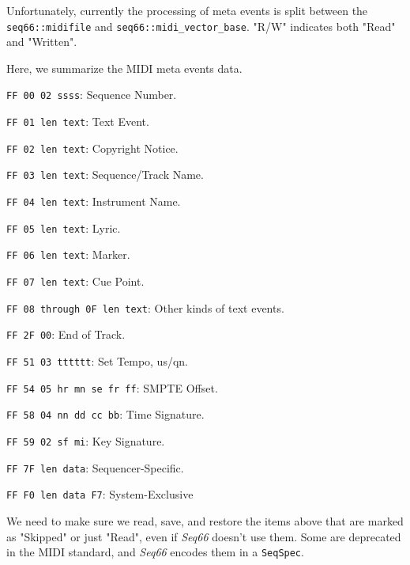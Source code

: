    Unfortunately, currently the processing of meta events is split between the
   \texttt{seq66::midifile} and
   \texttt{seq66::midi\_vector\_base}.
   "R/W" indicates both "Read" and "Written".

   Here, we summarize the MIDI meta events data.

   \begin{enumber}
      \item \texttt{FF 00 02 ssss}: Sequence Number.
      \item \texttt{FF 01 len text}: Text Event.
      \item \texttt{FF 02 len text}: Copyright Notice.
      \item \texttt{FF 03 len text}: Sequence/Track Name.
      \item \texttt{FF 04 len text}: Instrument Name.
      \item \texttt{FF 05 len text}: Lyric.
      \item \texttt{FF 06 len text}: Marker.
      \item \texttt{FF 07 len text}: Cue Point.
      \item \texttt{FF 08 through 0F len text}: Other kinds of  text events.
      \item \texttt{FF 2F 00}: End of Track.
      \item \texttt{FF 51 03 tttttt}: Set Tempo, us/qn.
      \item \texttt{FF 54 05 hr mn se fr ff}: SMPTE Offset.
      \item \texttt{FF 58 04 nn dd cc bb}: Time Signature.
      \item \texttt{FF 59 02 sf mi}: Key Signature.
      \item \texttt{FF 7F len data}: Sequencer-Specific.
      \item \texttt{FF F0 len data F7}: System-Exclusive
   \end{enumber}

   We need to make sure we read, save, and restore the items above that are
   marked as "Skipped" or just "Read",
   even if \textsl{Seq66} doesn't use them.
   Some are deprecated in the MIDI
   standard, and \textsl{Seq66} encodes them in a \texttt{SeqSpec}.

